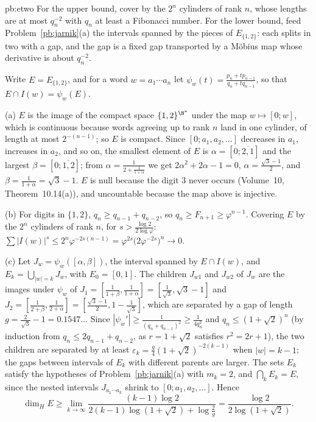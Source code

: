 \begin{solution}{pb:etwo}
\idea For the upper bound, cover by the $2^n$ cylinders of rank $n$, whose lengths are at most $q_n^{-2}$ with $q_n$ at least a Fibonacci number. For the lower bound,
feed Problem~\ref{pb:jarnik}(a) the intervals spanned by the pieces of $E_{\{1,2\}}$: each splits in two with a gap, and the gap is a fixed gap transported by a
Möbius map whose derivative is about $q_n^{-2}$.

\writeup Write $E=E_{\{1,2\}}$, and for a word $w=a_1\cdots a_n$ let $\psi_w(t)=\frac{p_n+tp_{n-1}}{q_n+tq_{n-1}}$, so that $E\cap I(w)=\psi_w(E)$.

(a) $E$ is the image of the compact space $\{1,2\}^{\N^*}$ under the map $w\mapsto[0;w]$, which is continuous because words agreeing up to rank $n$ land in one cylinder,
of length at most $2^{-(n-1)}$; so $E$ is compact. Since $[0;a_1,a_2,\dots]$ decreases in $a_1$, increases in $a_2$, and so on, the smallest element of $E$ is
$\alpha=[0;\overline{2,1}]$ and the largest $\beta=[0;\overline{1,2}]$; from $\alpha=\frac1{2+\frac1{1+\alpha}}$ we get $2\alpha^2+2\alpha-1=0$, $\alpha=\frac{\sqrt3-1}2$, and
$\beta=\frac1{1+\alpha}=\sqrt3-1$. $E$ is null because the digit $3$ never occurs (Volume~10, Theorem~10.14(a)), and uncountable because the map above is injective.

(b) For digits in $\{1,2\}$, $q_n\ge q_{n-1}+q_{n-2}$, so $q_n\ge F_{n+1}\ge\varphi^{n-1}$. Covering $E$ by the $2^n$ cylinders of rank $n$, for $s>\frac{\log2}{2\log\varphi}$:
$\sum|I(w)|^s\le2^n\varphi^{-2s(n-1)}=\varphi^{2s}\bigl(2\varphi^{-2s}\bigr)^n\to0$.

(c) Let $J_w=\psi_w([\alpha,\beta])$, the interval spanned by $E\cap I(w)$, and $E_k=\bigcup_{|w|=k}J_w$, with $E_0=[0,1]$. The children $J_{w1}$ and $J_{w2}$ of $J_w$ are the images under
$\psi_w$ of $J_1=[\frac1{1+\beta},\frac1{1+\alpha}]=[\frac1{\sqrt3},\sqrt3-1]$ and $J_2=[\frac1{2+\beta},\frac1{2+\alpha}]=[\frac{\sqrt3-1}2,1-\frac1{\sqrt3}]$, which are separated by a gap of
length $g=\frac2{\sqrt3}-1=0.1547\ldots$ Since $|\psi_w'|\ge\frac1{(q_n+q_{n-1})^2}\ge\frac1{4q_n^2}$ and $q_n\le(1+\sqrt2)^n$ (by induction from $q_n\le2q_{n-1}+q_{n-2}$, as
$r=1+\sqrt2$ satisfies $r^2=2r+1$), the two children are separated by at least $\varepsilon_{k}=\frac g4(1+\sqrt2)^{-2(k-1)}$ when $|w|=k-1$; the gaps between intervals of
$E_k$ with different parents are larger. The sets $E_k$ satisfy the hypotheses of Problem~\ref{pb:jarnik}(a) with $m_k=2$, and $\bigcap_kE_k=E$, since the nested intervals
$J_{a_1\cdots a_k}$ shrink to $[0;a_1,a_2,\dots]$. Hence
\[
\dim_HE\ge\lim_{k\to\infty}\frac{(k-1)\log2}{2(k-1)\log(1+\sqrt2)+\log\frac2g}=\frac{\log2}{2\log(1+\sqrt2)}.
\]


\end{solution}
